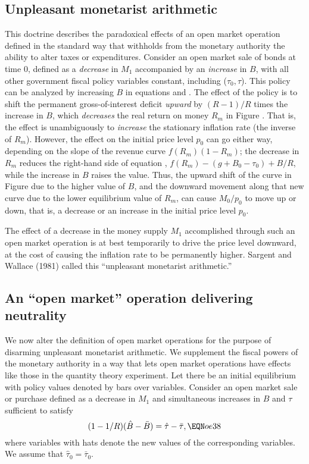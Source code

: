 \subsection{Unpleasant monetarist arithmetic}
This doctrine describes the paradoxical effects of an open market operation
defined in the standard way that withholds from the monetary authority
the ability to alter taxes or expenditures.
   Consider an open market sale of bonds at time $0$, defined
as a {\it decrease\/} in $M_1$ accompanied by an {\it increase\/}
 in $B$, with all other government fiscal policy variables constant, including
($\tau_0, \tau$).  This policy can be analyzed
by increasing $B$ in equations  and .
The effect of the policy
is to shift the permanent gross-of-interest deficit {\it upward\/}
by $(R-1)/R$ times the increase in $B$, which {\it decreases\/}
the real return on money $R_m$ in Figure . %
That is, the effect is unambiguously to
{\it increase\/} the stationary inflation rate (the inverse
of $R_m$). However, the effect on the initial price level $p_0$
can go either way,
depending on the slope of the revenue curve $f(R_m) (1-R_m)$;
the decrease in $R_m$ reduces the right-hand side of equation
, $f(R_m) - (g +B_0 -\tau_0) + B / R$, while the
increase in $B$ raises the value. Thus, the upward shift of the
curve in Figure  due to the higher value of $B$,
and the downward movement along that new curve due to the
lower equilibrium value of $R_m$, can cause $M_0/p_0$ to
move up or down,
that is, a decrease or an increase in the initial price
level $p_0$.


   The effect of a decrease in the money supply $M_1$ accomplished
through such an open market operation is at best temporarily to drive
the price level downward, at the cost of causing the inflation
rate to be permanently higher.  Sargent and Wallace (1981) called
this ``unpleasant monetarist arithmetic.''


\subsection{An ``open market'' operation delivering neutrality}
We now alter the definition of open market operations for the purpose of
disarming  unpleasant monetarist arithmetic.   We supplement
 the fiscal powers of the monetary authority in a way that lets open
market operations have effects like those in the quantity theory experiment.
Let there be an initial equilibrium with policy values denoted by bars
over variables. Consider an open market sale or purchase defined as a
decrease in $M_1$ and simultaneous increases in $B$ and $\tau$ sufficient
to satisfy
$$ (1 -1/R)(\hat B -\bar B) = \hat \tau - \bar \tau , \EQN oe38$$
where variables with hats denote the new values of the corresponding
variables.  We assume that $\hat \tau_0 = \bar \tau_0$.


